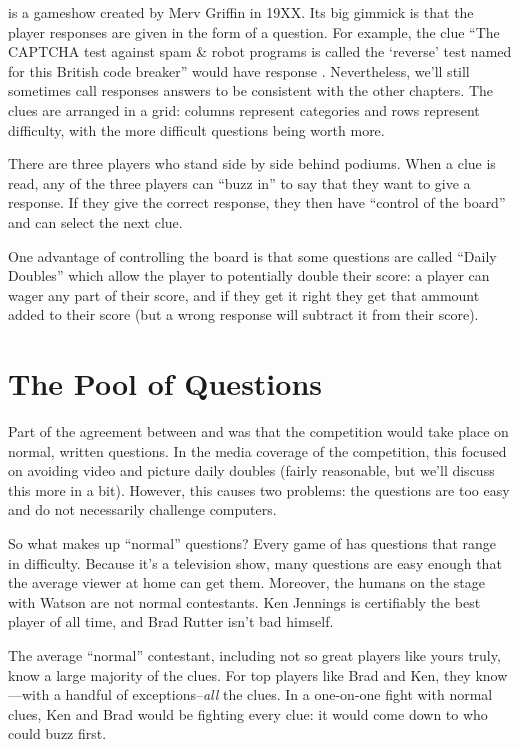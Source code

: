 \jeopardy{} is a gameshow created by Merv Griffin in 19XX.
%
Its big gimmick is that the player responses are given in the form of
a question.
%
For example, the clue ``The CAPTCHA test against spam \& robot programs
is called the `reverse' test named for this British code breaker''
would have response .
%
Nevertheless, we'll still sometimes call responses answers to be
consistent with the other chapters.
%
The clues are arranged in a grid: columns represent categories and
rows represent difficulty, with the more difficult questions being
worth more.

There are three players who stand side by side behind podiums.
%
When a clue is read, any of the three players can ``buzz in'' to say
that they want to give a response.
%
If they give the correct response, they then have ``control of the
board'' and can select the next clue.

One advantage of controlling the board is that some questions are
called ``Daily Doubles'' which allow the player to potentially double
their score: a player can wager any part of their score, and if they
get it right they get that ammount added to their score (but a wrong
response will subtract it from their score).

\section{The Pool of Questions}

Part of the agreement between \jeopardy{} and  was that the
competition would take place on normal, written questions.
%
In the media coverage of the competition, this focused on avoiding
video and picture daily doubles (fairly reasonable, but we'll discuss
this more in a bit).
%
However, this causes two problems: the questions are too easy and do
not necessarily challenge computers.

So what makes up ``normal'' questions?
%
Every game of \jeopardy{} has questions that range in difficulty.
%
Because it's a television show, many questions are easy enough that
the average viewer at home can get them.
%
Moreover, the humans on the stage with Watson are not normal contestants.
%
Ken Jennings is certifiably the best \jeopardy{} player of all time,
and Brad Rutter isn't bad himself.

The average ``normal'' \jeopardy{} contestant, including not so great
players like yours truly, know a large majority of the clues.
%
For top players like Brad and Ken, they know---with a handful of
exceptions--\emph{all} the clues.
%
In a one-on-one fight with normal clues, Ken and Brad would be
fighting every clue: it would come down to who could buzz first.

